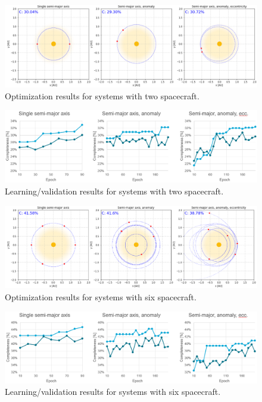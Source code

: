 \begin{figure}[htbp]
 \centering
 \includegraphics[width=1.0\textwidth]{img/orbits_2.png}
 \caption{Optimization results for systems with two spacecraft.}
 \label{fig:orbits_2}
\end{figure}
\begin{figure}[htbp]
 \centering
 \includegraphics[width=1.0\textwidth]{img/val_orbits_2.png}
 \caption{Learning/validation results for systems with two spacecraft.}
 \label{fig:val_orbits_2}
\end{figure}



\begin{figure}[htbp]
 \centering
 \includegraphics[width=1.0\textwidth]{img/orbits_6.png}
 \caption{Optimization results for systems with six spacecraft.}
 \label{fig:orbits_6}
\end{figure}
\begin{figure}[htbp]
 \centering
 \includegraphics[width=1.0\textwidth]{img/val_orbits_6.png}
 \caption{Learning/validation results for systems with six spacecraft.}
 \label{fig:val_orbits_6}
\end{figure}



